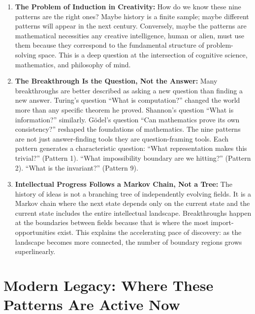 \begin{enumerate}
\item \textbf{The Problem of Induction in Creativity:} How do we know these nine patterns are the right ones? Maybe history is a finite sample; maybe different patterns will appear in the next century. Conversely, maybe the patterns are mathematical necessities any creative intelligence, human or alien, must use them because they correspond to the fundamental structure of problem-solving space. This is a deep question at the intersection of cognitive science, mathematics, and philosophy of mind.

\item \textbf{The Breakthrough Is the Question, Not the Answer:} Many breakthroughs are better described as asking a new question than finding a new answer. Turing's question ``What is computation?'' changed the world more than any specific theorem he proved. Shannon's question ``What is information?'' similarly. G\"odel's question ``Can mathematics prove its own consistency?'' reshaped the foundations of mathematics. The nine patterns are not just answer-finding tools they are question-framing tools. Each pattern generates a characteristic question: ``What representation makes this trivial?'' (Pattern 1). ``What impossibility boundary are we hitting?'' (Pattern 2). ``What is the invariant?'' (Pattern 9).

\item \textbf{Intellectual Progress Follows a Markov Chain, Not a Tree:} The history of ideas is not a branching tree of independently evolving fields. It is a Markov chain where the next state depends only on the current state and the current state includes the entire intellectual landscape. Breakthroughs happen at the boundaries between fields because that is where the most import-opportunities exist. This explains the accelerating pace of discovery: as the landscape becomes more connected, the number of boundary regions grows superlinearly.
\end{enumerate}

\section{Modern Legacy: Where These Patterns Are Active Now}
\label{sec:anatomy:legacy}


